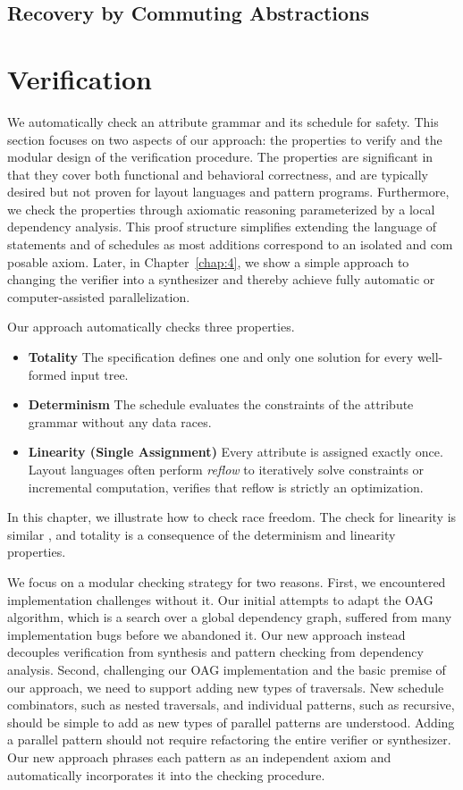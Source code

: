 \subsection{Recovery by Commuting Abstractions}





\section{Verification}

We automatically check an attribute grammar and its schedule for safety. This section focuses on two aspects of our approach: the properties to verify and the modular design of the verification procedure. The properties are significant in that they cover both functional and behavioral correctness, and are typically desired but not proven for layout languages and pattern programs. Furthermore, we check the properties through axiomatic reasoning parameterized by a local dependency analysis. This proof structure simplifies extending the language of statements and of schedules as most additions correspond to an isolated and com posable axiom. Later, in Chapter~\ref{chap:4}, we show a simple approach to changing the verifier into a synthesizer and thereby achieve fully automatic or computer-assisted parallelization.

Our approach automatically checks three properties. 
\begin{itemize}
\item \textbf{Totality} The specification defines one and only one solution for every well-formed input tree. 
\item \textbf{Determinism} The schedule evaluates the constraints of the attribute grammar without any data races.
\item \textbf{Linearity (Single Assignment)} Every attribute is assigned exactly once. Layout languages often perform \emph{reflow} to iteratively solve constraints or incremental computation, verifies that reflow is strictly an optimization.
\end{itemize}
In this chapter, we illustrate how to check race freedom. The check for linearity is similar , and totality is a consequence of the determinism and linearity properties.

We focus on a modular checking strategy for two reasons. First, we encountered implementation challenges without it. Our initial attempts to adapt the OAG~\cite{oag} algorithm, which is a search over a global dependency graph, suffered from many implementation bugs before we abandoned it. Our new approach instead decouples verification from synthesis and pattern checking from dependency analysis. Second, challenging our OAG implementation and the basic premise of our approach, we need to support adding new types of traversals. New schedule combinators, such as nested traversals, and individual patterns, such as recursive, should be simple to add as new types of parallel patterns are understood. Adding a parallel pattern should not require refactoring the entire verifier or synthesizer. Our new approach phrases each pattern as an independent axiom and automatically incorporates it into the checking procedure.


